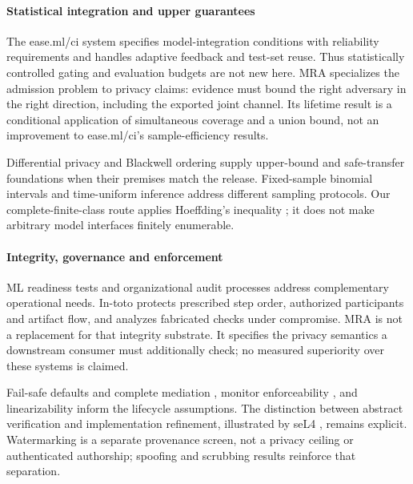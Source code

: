 \documentclass[conference,compsoc]{IEEEtran}
\begin{document}
\paragraph{Statistical integration and upper guarantees}
The ease.ml/ci system \citep{renggli2019easeml} specifies model-integration
conditions with reliability requirements and handles adaptive feedback and
test-set reuse. Thus statistically controlled gating and evaluation budgets
are not new here. MRA specializes the admission problem to privacy claims:
evidence must bound the right adversary in the right direction, including
the exported joint channel. Its lifetime result is a conditional application
of simultaneous coverage and a union bound, not an improvement to
ease.ml/ci's sample-efficiency results.

Differential privacy \citep{dwork2006calibrating,dwork2014foundations} and
Blackwell ordering \citep{blackwell1953experiments} supply upper-bound and
safe-transfer foundations when their premises match the release.
Fixed-sample binomial intervals \citep{clopper1934confidence} and
time-uniform inference \citep{howard2021confidence} address different
sampling protocols. Our complete-finite-class route applies Hoeffding's
inequality \citep{hoeffding1963bounded}; it does not make arbitrary model
interfaces finitely enumerable.

\paragraph{Integrity, governance and enforcement}
ML readiness tests \citep{breck2017mltest} and organizational audit processes
\citep{raji2020accountability} address complementary operational needs.
In-toto \citep{torresarias2019intoto} protects prescribed step order,
authorized participants and artifact flow, and analyzes fabricated checks
under compromise. MRA is not a replacement for that integrity substrate.
It specifies the privacy semantics a downstream consumer must additionally
check; no measured superiority over these systems is claimed.

Fail-safe defaults and complete mediation \citep{saltzer1975protection},
monitor enforceability \citep{schneider2000enforceable}, and linearizability
\citep{herlihy1990linearizability} inform the lifecycle assumptions.
The distinction between abstract verification and implementation refinement,
illustrated by seL4 \citep{klein2009sel4}, remains explicit. Watermarking
\citep{kirchenbauer2023watermark} is a separate provenance screen, not a
privacy ceiling or authenticated authorship; spoofing and scrubbing results
\citep{jovanovic2024stealing} reinforce that separation.
\end{document}
